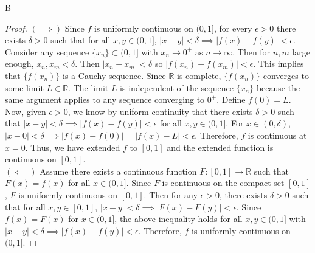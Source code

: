 \documentclass[11pt]{article}
\begin{document}
\begin{exercise}{B}
    \begin{proof}
        $(\implies)$ Since $f$ is uniformly continuous on $(0, 1]$, for every $\epsilon > 0$ there exists $\delta > 0$ such that for all $x, y \in (0, 1]$, $|x - y| < \delta \implies |f(x) - f(y)| < \epsilon$. Consider any sequence $\{ x_n \} \subset (0, 1]$ with $x_n \to 0^+$ as $n \to \infty$. Then for $n, m$ large enough, $x_n, x_m < \delta$. Then $| x_n - x_m | < \delta$ so $|f(x_n) - f(x_m)| < \epsilon$. This implies that $\{ f(x_n) \}$ is a Cauchy sequence. Since $\mathbb{R}$ is complete, $\{ f(x_n) \}$ converges to some limit $L \in \mathbb{R}$. The limit $L$ is independent of the sequence $\{ x_n \}$ because the same argument applies to any sequence converging to $0^+$. Define $f(0) = L$. Now, given $\epsilon > 0$, we know by uniform continuity that there exists $\delta > 0$ such that $|x - y| < \delta \implies |f(x) - f(y)| < \epsilon $ for all $x, y \in (0, 1]$. For $x \in (0, \delta)$, $|x - 0| < \delta \implies |f(x) - f(0)| = |f(x) - L| < \epsilon$. Therefore, $f$ is continuous at $x = 0$. Thus, we have extended $f$ to $[0, 1]$ and the extended function is continuous on $[0, 1]$. \\

        $(\impliedby)$ Assume there exists a continuous function $F: [0, 1] \to \mathbb{R}$ such that $F(x) = f(x)$ for all $x \in (0, 1]$. Since $F$ is continuous on the compact set $[0, 1]$, $F$ is uniformly continuous on $[0, 1]$. Then for any $\epsilon > 0$, there exists $\delta > 0$ such that for all $x, y \in [0, 1]$, $| x- y | < \delta \implies |F(x) - F(y)| < \epsilon$. Since $f(x) = F(x)$ for $x \in (0, 1]$, the above inequality holds for all $x, y \in (0, 1]$ with $|x - y| < \delta \implies |f(x) - f(y)| < \epsilon$. Therefore, $f$ is uniformly continuous on $(0, 1]$. 
    \end{proof}
\end{exercise}
\end{document}
